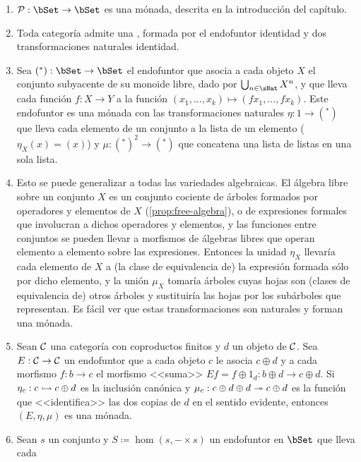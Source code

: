 \begin{example}\label{ex:monads}\;
  \begin{enumerate}
  \item $\power:\bSet\to\bSet$ es una mónada, descrita en la introducción del
    capítulo.
  \item Toda categoría admite una , formada por el
    endofuntor identidad y dos transformaciones naturales identidad.
  \item Sea $(^*):\bSet\to\bSet$ el endofuntor que asocia a cada objeto $X$ el
    conjunto subyacente de su monoide libre, dado por $\bigcup_{n\in\sNat}X^n$,
    y que lleva cada función $f:X\to Y$ a la función
    $(x_1,\dots,x_k)\mapsto(fx_1,\dots,fx_k)$. Este endofuntor es una mónada con
    las transformaciones naturales $\eta:1\to(^*)$ que lleva cada elemento de un
    conjunto a la lista de un elemento ($\eta_X(x)=(x)$) y $\mu:(^*)^2\to(^*)$
    que concatena una lista de listas en una sola lista.
  \item \label{enu:monad-variety} Esto se puede generalizar a todas las
    variedades algebraicas. El álgebra libre sobre un conjunto $X$ es un
    conjunto cociente de árboles formados por operadores y elementos de $X$
    (\ref{prop:free-algebra}), o de expresiones formales que involucran a dichos
    operadores y elementos, y las funciones entre conjuntos se pueden llevar a
    morfismos de álgebras libres que operan elemento a elemento sobre las
    expresiones.  Entonces la unidad $\eta_X$ llevaría cada elemento de $X$ a
    (la clase de equivalencia de) la expresión formada sólo por dicho elemento,
    y la unión $\mu_X$ tomaría árboles cuyas hojas son (clases de equivalencia
    de) otros árboles y sustituiría las hojas por los subárboles que
    representan. Es fácil ver que estas transformaciones son naturales y forman
    una mónada.
  \item \label{enu:monad-result} Sean $\mathcal{C}$ una categoría con coproductos
    finitos y $d$ un objeto de $\mathcal{C}$. Sea $E:\mathcal{C}\to\mathcal{C}$ un endofuntor que a cada
    objeto $c$ le asocia $c\oplus d$ y a cada morfismo $f:b\to c$ el morfismo
    <<suma>> $Ef=f\oplus 1_d:b\oplus d\to c\oplus d$. Si
    $\eta_c:c\rightarrowtail c\oplus d$ es la inclusión canónica y
    $\mu_c:c\oplus d\oplus d\twoheadrightarrow c\oplus d$ es la función que <<identifica>>
    las dos copias de $d$ en el sentido evidente, entonces $(E,\eta,\mu)$ es una
    mónada.
  \item \label{enu:monad-state} Sean $s$ un conjunto y
    $S\coloneqq\hom(s,-\times s)$ un endofuntor en $\bSet$ que lleva cada

\end{enumerate}
\end{example}
